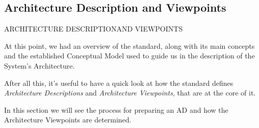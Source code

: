 		\subsection{Architecture Description and Viewpoints}
		
		\begin{frame}
			\begin{center}
				\begin{LARGE}
					ARCHITECTURE DESCRIPTION\newline\newline AND VIEWPOINTS
				\end{LARGE}
			\end{center}
		\end{frame}
				
		
		\begin{frame}
		
		At this point, we had an overview of the standard, along with its main concepts and the established Conceptual Model used to guide us in the description of the System's Architecture.
		\newline\newline
		
		After all this, it's useful to have a quick look at how the standard defines \emph{Architecture Descriptions} and \emph{Architecture Viewpoints}, that are at the core of it.\newline\newline
		
		In this section we will see the process for preparing an AD and how the Architecture Viewpoints are determined.
		
		\end{frame}
		
